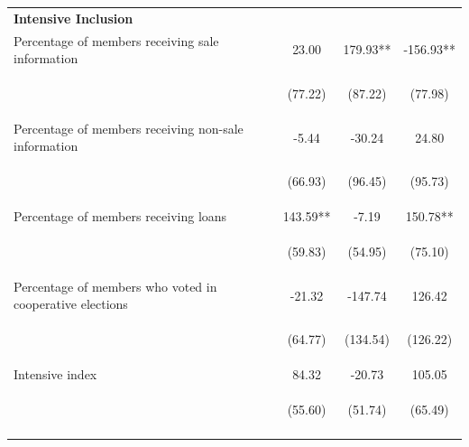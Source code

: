 \documentclass[11pt]{article}
\begin{document}
\begin{table}[H]
{\begin{tabularx}{1.1\linewidth}{lccc}
 
 \textbf{Intensive Inclusion} & & & \\
\noalign{\smallskip}Percentage of members receiving sale information & 23.00 & 179.93** & -156.93**\\
 & \begin{footnotesize}(77.22)\end{footnotesize} & \begin{footnotesize}(87.22)\end{footnotesize} & \begin{footnotesize}(77.98)\end{footnotesize}\\
\noalign{\smallskip}Percentage of members receiving non-sale information & -5.44 & -30.24 & 24.80\\
 & \begin{footnotesize}(66.93)\end{footnotesize} & \begin{footnotesize}(96.45)\end{footnotesize} & \begin{footnotesize}(95.73)\end{footnotesize}\\
\noalign{\smallskip}Percentage of members receiving loans & 143.59** & -7.19 & 150.78**\\
 & \begin{footnotesize}(59.83)\end{footnotesize} & \begin{footnotesize}(54.95)\end{footnotesize} & \begin{footnotesize}(75.10)\end{footnotesize}\\
\noalign{\smallskip}Percentage of members who voted in cooperative elections & -21.32 & -147.74 & 126.42\\
 & \begin{footnotesize}(64.77)\end{footnotesize} & \begin{footnotesize}(134.54)\end{footnotesize} & \begin{footnotesize}(126.22)\end{footnotesize}\\
\noalign{\smallskip}Intensive index & 84.32 & -20.73 & 105.05\\
 & \begin{footnotesize}(55.60)\end{footnotesize} & \begin{footnotesize}(51.74)\end{footnotesize} & \begin{footnotesize}(65.49)\end{footnotesize}\\
\noalign{\smallskip}\hline
  \end{tabularx}}
\end{table}
\doublespacing
\end{document}
